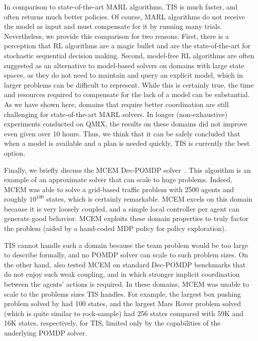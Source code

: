 \documentclass[runningheads]{llncs}
\newcommand{\citeauthor}{\cite}
\begin{document}
In comparison to state-of-the-art  MARL algorithms, TIS is much faster, and often returns much better policies. Of course, MARL algorithms do not receive the model as input and must compensate for it by running many trials. Nevertheless, we provide this comparison for two reasons. First, there is a perception that RL algorithms are a magic bullet and are the state-of-the-art for stochastic sequential decision making. Second, 
model-free RL algorithms are often suggested as an alternative to model-based solvers on domains with large state spaces, as they do not need to maintain and query an explicit model, which in larger problems can be difficult to represent. While this is certainly true, the time and resources required to compensate for the lack of a model can be substantial. 
As we have shown here,  domains that require better coordination
are still challenging for state-of-the-art MARL solvers. In longer (non-exhaustive) experiments conducted on QMIX, the results on these domains did not improve even given over 10 hours. Thus, we think that it can be safely concluded that when a model is available and a plan is needed quickly, TIS is currently the best
option.


Finally, we briefly discuss the MCEM Dec-POMDP solver~\cite{WuZJ13}. This algorithm is an example of an
approximate solver that can scale to huge problems. Indeed, MCEM was able to solve a grid-based traffic problem with 2500 agents and roughly $10^{100}$ states, which is certainly remarkable. MCEM excels on this domain because it is very loosely coupled, and a simple local controller per agent can generate good behavior. MCEM exploits these domain properties to truly factor the problem (aided by
a hand-coded MDP policy for policy exploration). 

TIS cannot handle such a domain because the team problem would be too large to describe formally, and no POMDP solver can scale to such problem sizes. On the other hand, \citeauthor{WuZJ13}
also tested MCEM on standard Dec-POMDP benchmarks that do not enjoy such weak coupling, and in which stronger implicit coordination between the agents' actions is required. In these domains, MCEM was unable to scale to the problems sizes TIS handles. For example, the largest box pushing problem solved by \citeauthor{WuZJ13} had 100 states, and the largest Mars Rover problem solved (which is quite similar to rock-sample) had 256 states compared with 59K and 16K states, respectively, for TIS, limited only by the capabilities of the underlying POMDP solver. 
\end{document}
